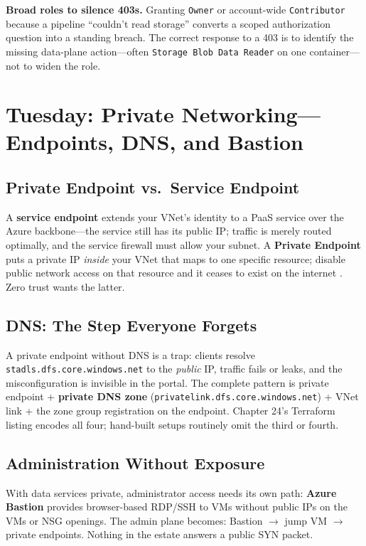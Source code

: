 \begin{pitfall}
\textbf{Broad roles to silence 403s.} Granting \texttt{Owner} or account-wide \texttt{Contributor} because a pipeline ``couldn't read storage'' converts a scoped authorization question into a standing breach. The correct response to a 403 is to identify the missing data-plane action---often \texttt{Storage Blob Data Reader} on one container---not to widen the role.
\end{pitfall}

\section{Tuesday: Private Networking---Endpoints, DNS, and Bastion}

\subsection{Private Endpoint vs.\ Service Endpoint}
A \textbf{service endpoint} extends your VNet's identity to a PaaS service over the Azure backbone---the service still has its public IP; traffic is merely routed optimally, and the service firewall must allow your subnet. A \textbf{Private Endpoint} puts a private IP \emph{inside} your VNet that maps to one specific resource; disable public network access on that resource and it ceases to exist on the internet \cite{microsoft2025privateLink}. Zero trust wants the latter.

\subsection{DNS: The Step Everyone Forgets}
A private endpoint without DNS is a trap: clients resolve \texttt{stadls.dfs.core.windows.net} to the \emph{public} IP, traffic fails or leaks, and the misconfiguration is invisible in the portal. The complete pattern is private endpoint + \textbf{private DNS zone} (\texttt{privatelink.dfs.core.windows.net}) + VNet link + the zone group registration on the endpoint. Chapter 24's Terraform listing encodes all four; hand-built setups routinely omit the third or fourth.

\subsection{Administration Without Exposure}
With data services private, administrator access needs its own path: \textbf{Azure Bastion} provides browser-based RDP/SSH to VMs without public IPs on the VMs or NSG openings. The admin plane becomes: Bastion $\rightarrow$ jump VM $\rightarrow$ private endpoints. Nothing in the estate answers a public SYN packet.


